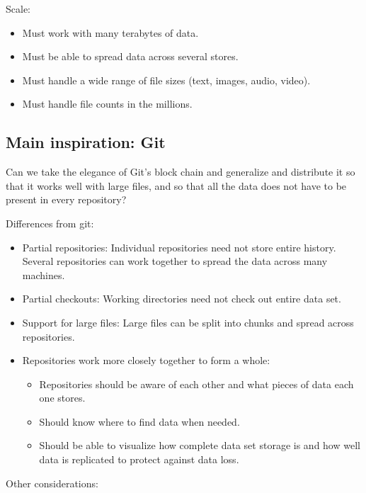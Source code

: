 \documentclass[a4paper]{article}
\begin{document}
Scale:

\begin{itemize}
\item
  Must work with many terabytes of data.
\item
  Must be able to spread data across several stores.
\item
  Must handle a wide range of file sizes (text, images, audio, video).
\item
  Must handle file counts in the millions.
\end{itemize}

\subsection{Main inspiration: Git}\label{main-inspiration-git}

Can we take the elegance of Git's block chain and generalize and
distribute it so that it works well with large files, and so that all
the data does not have to be present in every repository?

Differences from git:

\begin{itemize}
\item
  Partial repositories: Individual repositories need not store entire
  history. Several repositories can work together to spread the data
  across many machines.
\item
  Partial checkouts: Working directories need not check out entire data
  set.
\item
  Support for large files: Large files can be split into chunks and
  spread across repositories.
\item
  Repositories work more closely together to form a whole:

  \begin{itemize}
  \item
    Repositories should be aware of each other and what pieces of data
    each one stores.
  \item
    Should know where to find data when needed.
  \item
    Should be able to visualize how complete data set storage is and how
    well data is replicated to protect against data loss.
  \end{itemize}
\end{itemize}

Other considerations:
\end{document}
